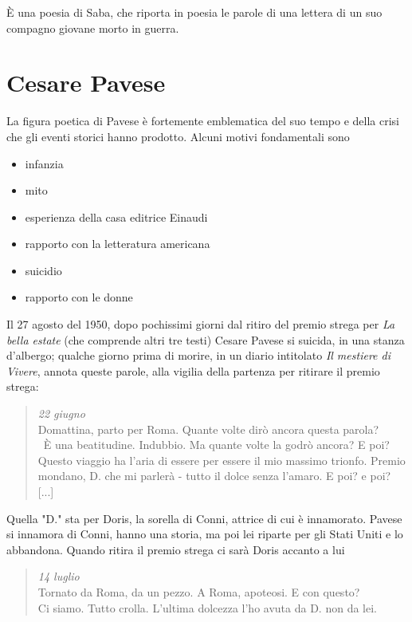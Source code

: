 \documentclass[a4paper, twoside, titlepage]{book}
\newcounter{mar}
\newcommand{\elenco}[1]{%
\begin{itemize}
#1
\end{itemize}}
\newcommand{\citazione}[1]{%
  \begin{quotation}
  \begin{linenumbers}
  \modulolinenumbers[5]
  \begingroup
  \setlength{\parindent}{0cm}
  \noindent #1
  \endgroup
  \end{linenumbers}
  \end{quotation}\setcounter{linenumber}{1}
  }
\begin{document}
È una poesia di Saba, che riporta in poesia le parole di una lettera di un suo compagno giovane morto in guerra.

\chapter{Cesare Pavese}

La figura poetica di Pavese è fortemente emblematica del suo tempo e della crisi che gli eventi storici hanno prodotto. Alcuni motivi fondamentali sono
\elenco{\item infanzia\item mito\item esperienza della casa editrice Einaudi\item rapporto con la letteratura americana\item suicidio\item rapporto con le donne}

Il 27 agosto del 1950, dopo pochissimi giorni dal ritiro del premio strega per \textit{La bella estate} (che comprende altri tre testi) Cesare Pavese si suicida, in una stanza d'albergo; qualche giorno prima di morire, in un diario intitolato \textit{Il mestiere di Vivere}, annota queste parole, alla vigilia della partenza per ritirare il premio strega:

\citazione{\textit{22 giugno}\\
Domattina, parto per Roma. Quante volte dirò ancora questa parola?\\\
È una beatitudine. Indubbio. Ma quante volte la godrò ancora? E poi?\\
Questo viaggio ha l'aria di essere per essere il mio massimo trionfo. Premio mondano, D. che mi parlerà - tutto il dolce senza l'amaro. E poi? e poi? [...]}

Quella "D." sta per Doris, la sorella di Conni, attrice di cui è innamorato. Pavese si innamora di Conni, hanno una storia, ma poi lei riparte per gli Stati Uniti e lo abbandona.
Quando ritira il premio strega ci sarà Doris accanto a lui

\citazione{\textit{14 luglio}\\
Tornato da Roma, da un pezzo. A Roma, apoteosi. E con questo?\\
Ci siamo. Tutto crolla. L'ultima dolcezza l'ho avuta da D. non da lei.}
\end{document}
